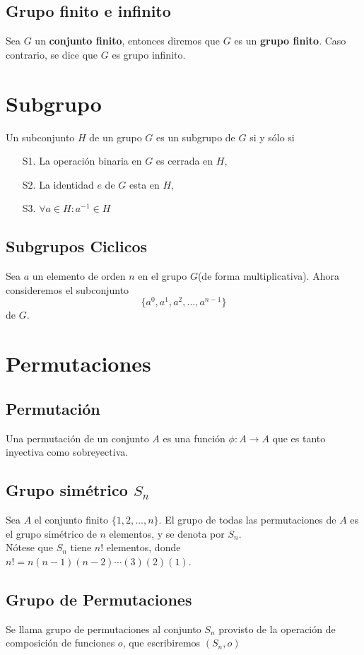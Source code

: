 \documentclass{article}
\begin{document}
\subsection{Grupo finito e infinito}
Sea $G$ un \textbf{conjunto finito}, entonces diremos que $G$ es un \textbf{grupo finito}. Caso contrario, se dice que $G$ es grupo infinito.
\section{Subgrupo}
Un subconjunto $H$ de un grupo $G$ es un subgrupo de $G$ si y sólo si
\begin{itemize}
    \item[S1.] La operación binaria en $G$ es cerrada en $H$,
    \item[S2.] La identidad $e$ de $G$ esta en $H$,
    \item[S3.] $\forall a\in H: a^{-1}\in H$ 
\end{itemize}
\subsection{Subgrupos Ciclicos}
Sea $a$ un elemento de orden $n$ en el grupo $G$(de forma multiplicativa). Ahora consideremos el subconjunto
\[\{a^0,a^1,a^2,...,a^{n-1}\}\]
de $G$.
\section{Permutaciones}
\subsection{Permutación}
Una permutación de un conjunto $A$ es una función $\phi : A \rightarrow A$ que es tanto inyectiva como sobreyectiva.
\subsection{Grupo simétrico $S_n$}
Sea $A$ el conjunto finito $\{1, 2, \dots, n\}$. El grupo de todas las permutaciones de $A$ es el grupo simétrico de $n$ elementos, y se denota por $S_n$.\\
Nótese que $S_n$ tiene $n!$ elementos, donde $n! = n(n - 1)(n - 2) \dotsm (3)(2)(1)$.
\subsection{Grupo de Permutaciones}
Se llama grupo de permutaciones al conjunto $S_n$ provisto de la operación de composición de funciones $o$, que escribiremos $(S_n,o)$
\end{document}
